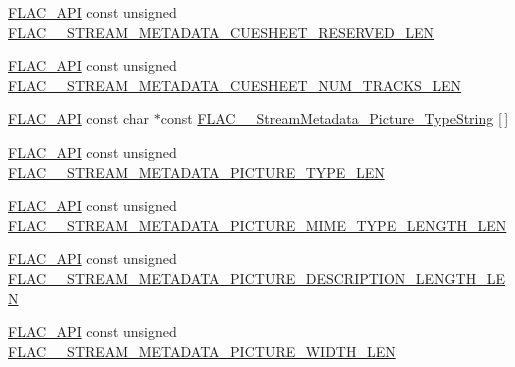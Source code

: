 \begin{DoxyCompactItemize}
\item 
\mbox{\hyperlink{group__flac__export_ga56ca07df8a23310707732b1c0007d6f5}{F\+L\+A\+C\+\_\+\+A\+PI}} const unsigned \mbox{\hyperlink{group__flac__format_ga7f301f901b430c3acb334809f4641ded}{F\+L\+A\+C\+\_\+\+\_\+\+S\+T\+R\+E\+A\+M\+\_\+\+M\+E\+T\+A\+D\+A\+T\+A\+\_\+\+C\+U\+E\+S\+H\+E\+E\+T\+\_\+\+R\+E\+S\+E\+R\+V\+E\+D\+\_\+\+L\+EN}}
\item 
\mbox{\hyperlink{group__flac__export_ga56ca07df8a23310707732b1c0007d6f5}{F\+L\+A\+C\+\_\+\+A\+PI}} const unsigned \mbox{\hyperlink{group__flac__format_gac45ce3823397c3c2a5c56e86fc121e0f}{F\+L\+A\+C\+\_\+\+\_\+\+S\+T\+R\+E\+A\+M\+\_\+\+M\+E\+T\+A\+D\+A\+T\+A\+\_\+\+C\+U\+E\+S\+H\+E\+E\+T\+\_\+\+N\+U\+M\+\_\+\+T\+R\+A\+C\+K\+S\+\_\+\+L\+EN}}
\item 
\mbox{\hyperlink{group__flac__export_ga56ca07df8a23310707732b1c0007d6f5}{F\+L\+A\+C\+\_\+\+A\+PI}} const char $\ast$const \mbox{\hyperlink{group__flac__format_gaddee484e4ef594f23402072a950e00fd}{F\+L\+A\+C\+\_\+\+\_\+\+Stream\+Metadata\+\_\+\+Picture\+\_\+\+Type\+String}} \mbox{[}$\,$\mbox{]}
\item 
\mbox{\hyperlink{group__flac__export_ga56ca07df8a23310707732b1c0007d6f5}{F\+L\+A\+C\+\_\+\+A\+PI}} const unsigned \mbox{\hyperlink{group__flac__format_ga6afbd9c5fe1936bd73fd75768419414e}{F\+L\+A\+C\+\_\+\+\_\+\+S\+T\+R\+E\+A\+M\+\_\+\+M\+E\+T\+A\+D\+A\+T\+A\+\_\+\+P\+I\+C\+T\+U\+R\+E\+\_\+\+T\+Y\+P\+E\+\_\+\+L\+EN}}
\item 
\mbox{\hyperlink{group__flac__export_ga56ca07df8a23310707732b1c0007d6f5}{F\+L\+A\+C\+\_\+\+A\+PI}} const unsigned \mbox{\hyperlink{group__flac__format_gadcaf6e90f8457929c7fa447d19c2b214}{F\+L\+A\+C\+\_\+\+\_\+\+S\+T\+R\+E\+A\+M\+\_\+\+M\+E\+T\+A\+D\+A\+T\+A\+\_\+\+P\+I\+C\+T\+U\+R\+E\+\_\+\+M\+I\+M\+E\+\_\+\+T\+Y\+P\+E\+\_\+\+L\+E\+N\+G\+T\+H\+\_\+\+L\+EN}}
\item 
\mbox{\hyperlink{group__flac__export_ga56ca07df8a23310707732b1c0007d6f5}{F\+L\+A\+C\+\_\+\+A\+PI}} const unsigned \mbox{\hyperlink{group__flac__format_gab3a293664bc479d1a1367631d7b776f7}{F\+L\+A\+C\+\_\+\+\_\+\+S\+T\+R\+E\+A\+M\+\_\+\+M\+E\+T\+A\+D\+A\+T\+A\+\_\+\+P\+I\+C\+T\+U\+R\+E\+\_\+\+D\+E\+S\+C\+R\+I\+P\+T\+I\+O\+N\+\_\+\+L\+E\+N\+G\+T\+H\+\_\+\+L\+EN}}
\item 
\mbox{\hyperlink{group__flac__export_ga56ca07df8a23310707732b1c0007d6f5}{F\+L\+A\+C\+\_\+\+A\+PI}} const unsigned \mbox{\hyperlink{group__flac__format_ga4e7491ae179e5c713e2246ac80cf36e6}{F\+L\+A\+C\+\_\+\+\_\+\+S\+T\+R\+E\+A\+M\+\_\+\+M\+E\+T\+A\+D\+A\+T\+A\+\_\+\+P\+I\+C\+T\+U\+R\+E\+\_\+\+W\+I\+D\+T\+H\+\_\+\+L\+EN}}

\end{DoxyCompactItemize}
